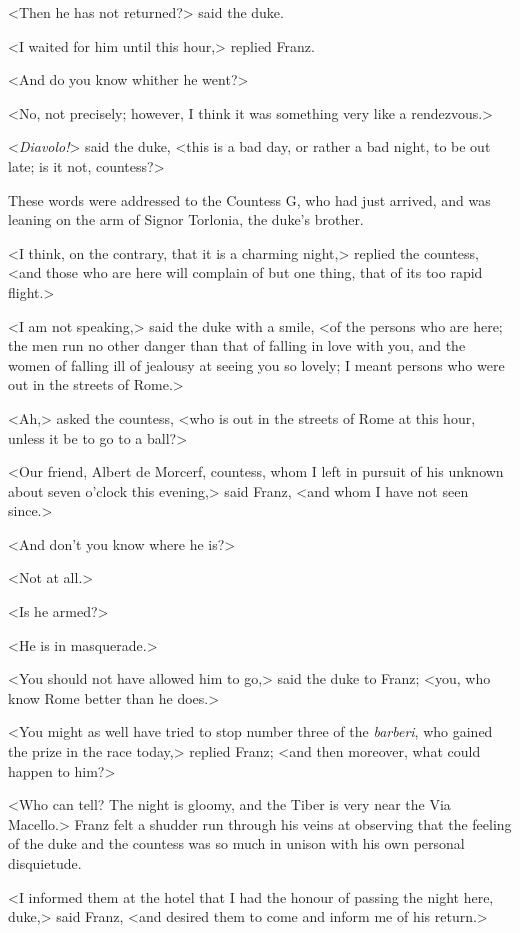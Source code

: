  <Then he has not returned?> said the duke. 

 <I waited for him until this hour,> replied Franz. 

 <And do you know whither he went?> 

 <No, not precisely; however, I think it was something very like a rendezvous.> 

 <\textit{Diavolo!}> said the duke, <this is a bad day, or rather a bad night, to be out late; is it not, countess?> 

 These words were addressed to the Countess G\doubleemdash, who had just arrived, and was leaning on the arm of Signor Torlonia, the duke's brother. 

 <I think, on the contrary, that it is a charming night,> replied the countess, <and those who are here will complain of but one thing, that of its too rapid flight.> 

 <I am not speaking,> said the duke with a smile, <of the persons who are here; the men run no other danger than that of falling in love with you, and the women of falling ill of jealousy at seeing you so lovely; I meant persons who were out in the streets of Rome.> 

 <Ah,> asked the countess, <who is out in the streets of Rome at this hour, unless it be to go to a ball?> 

 <Our friend, Albert de Morcerf, countess, whom I left in pursuit of his unknown about seven o'clock this evening,> said Franz, <and whom I have not seen since.> 

 <And don't you know where he is?> 

 <Not at all.> 

 <Is he armed?> 

 <He is in masquerade.> 

 <You should not have allowed him to go,> said the duke to Franz; <you, who know Rome better than he does.> 

 <You might as well have tried to stop number three of the \textit{barberi}, who gained the prize in the race today,> replied Franz; <and then moreover, what could happen to him?> 

 <Who can tell? The night is gloomy, and the Tiber is very near the Via Macello.> Franz felt a shudder run through his veins at observing that the feeling of the duke and the countess was so much in unison with his own personal disquietude. 

 <I informed them at the hotel that I had the honour of passing the night here, duke,> said Franz, <and desired them to come and inform me of his return.> 

